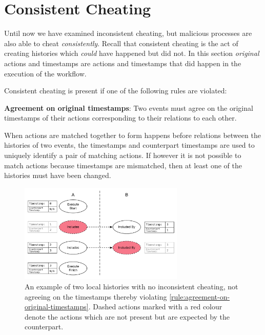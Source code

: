 	\section{Consistent Cheating}
	Until now we have examined inconsistent cheating, but malicious processes are also able to cheat \textit{consistently}. Recall that consistent cheating is the act of creating histories which \textit{could} have happened but did not. In this section \textit{original} actions and timestamps are actions and timestamps that did happen in the execution of the workflow. 

	\newpar Consistent cheating is present if one of the following rules are violated:

	\begin{ruledef}
		\textbf{Agreement on original timestamps}: Two events must agree on the original timestamps of their actions corresponding to their relations to each other.
		\label{rule:agreement-on-original-timestamps}
	\end{ruledef}
	
	\noindent When actions are matched together to form happens before relations between the histories of two events, the timestamps and counterpart timestamps are used to uniquely identify a pair of matching actions. If however it is not possible to match actions because timestamps are mismatched, then at least one of the histories must have been changed. 
	
	\begin{figure}[H]
		\centering
		\includegraphics[width=0.7\textwidth]{6validation/images/agreement-on-original-timestamps.pdf}
		\caption{An example of two local histories with no inconsistent cheating, not agreeing on the timestamps thereby violating \autoref{rule:agreement-on-original-timestamps}. Dashed actions marked with a red colour denote the actions which are not present but are expected by the counterpart.}
		\label{fig:agreement-on-original-timestamps}
	\end{figure}
	
